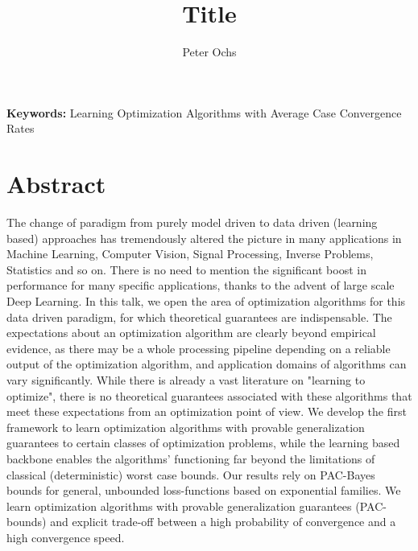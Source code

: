\documentclass[11pt]{article}
\title{\bfseries Title}
\author{Peter Ochs
}
\date{}
\begin{document}
\maketitle

\vspace{-1em}

\noindent
\textbf{Keywords:}
Learning Optimization Algorithms with Average Case Convergence Rates

\vspace{0.5em}


\vspace{1em}

\section*{Abstract}

The change of paradigm from purely model driven to data driven (learning based) approaches has tremendously altered the picture in many applications in Machine Learning, Computer Vision, Signal Processing, Inverse Problems, Statistics and so on. There is no need to mention the significant boost in performance for many specific applications, thanks to the advent of large scale Deep Learning. In this talk, we open the area of optimization algorithms for this data driven paradigm, for which theoretical guarantees are indispensable. The expectations about an optimization algorithm are clearly beyond empirical evidence, as there may be a whole processing pipeline depending on a reliable output of the optimization algorithm, and application domains of algorithms can vary significantly. While there is already a vast literature on "learning to optimize", there is no theoretical guarantees associated with these algorithms that meet these expectations from an optimization point of view. We develop the first framework to learn optimization algorithms with provable generalization guarantees to certain classes of optimization problems, while the learning based backbone enables the algorithms' functioning far beyond the limitations of classical (deterministic) worst case bounds. Our results rely on PAC-Bayes bounds for general, unbounded loss-functions based on exponential families. We learn optimization algorithms with provable generalization guarantees (PAC-bounds) and explicit trade-off between a high probability of convergence and a high convergence speed.



\vspace{1em}

\noindent

\vspace{1em}

\end{document}
